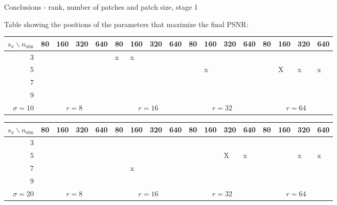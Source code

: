 \documentclass[mathserif, 8pt]{beamer}
\makeatletter
\newcounter{multipleslide}
\newcommand{\multipleframe}{%
\setcounter{multipleslide}{\value{framenumber}}
\stepcounter{multipleslide}
\patchcmd{\beamer@@tmpl@footline}%
	{\insertframenumber}%
	{\themultipleslide}%
	{}%
	{}%
}
\makeatother
\begin{document}
\multipleframe
\begin{frame}{Conclusions - rank, number of patches and patch size, stage 1}

	\begin{center}
		Table showing the positions of the parameters that maximize the final PSNR:

		\medskip

		{\small
		\begin{tabular}{r ||p{.1cm}|p{.1cm}|p{.1cm}|p{.1cm}||p{.1cm}|p{.1cm}|p{.1cm}|p{.1cm}||p{.1cm}|p{.1cm}|p{.1cm}|p{.1cm}||p{.1cm}|p{.1cm}|p{.1cm}|p{.1cm}||}
				$s_x \backslash n_{\text{sim}}$  & {\tiny 80} & {\tiny 160} & {\tiny 320} & {\tiny 640} & {\tiny 80} & {\tiny 160} & {\tiny 320} & {\tiny 640} & {\tiny 80} & {\tiny 160} & {\tiny 320} & {\tiny 640} & {\tiny 80} & {\tiny 160} & {\tiny 320} & {\tiny 640} \\\hline
		  3 &  &  &  &  &x &x &  &  &  &  &  &  &  &  &  &  \\[.1cm]\hline
		  5 &  &  &  &  &  &  &  &  &  &x &  &  &  &X &x &x \\[.1cm]\hline
		  7 &  &  &  &  &  &  &  &  &  &  &  &  &  &  &  &  \\[.1cm]\hline
		  9 &  &  &  &  &  &  &  &  &  &  &  &  &  &  &  &  \\[.1cm]\hline
		$\sigma=10$& \multicolumn{4}{c||}{$r =  8$} & 
		\multicolumn{4}{c||}{$r = 16$} & 
		\multicolumn{4}{c||}{$r = 32$} & 
		\multicolumn{4}{c||}{$r = 64$} 
		\end{tabular}}

		\medskip

		{\small
		\begin{tabular}{r ||p{.1cm}|p{.1cm}|p{.1cm}|p{.1cm}||p{.1cm}|p{.1cm}|p{.1cm}|p{.1cm}||p{.1cm}|p{.1cm}|p{.1cm}|p{.1cm}||p{.1cm}|p{.1cm}|p{.1cm}|p{.1cm}||}
				$s_x \backslash n_{\text{sim}}$  & {\tiny 80} & {\tiny 160} & {\tiny 320} & {\tiny 640} & {\tiny 80} & {\tiny 160} & {\tiny 320} & {\tiny 640} & {\tiny 80} & {\tiny 160} & {\tiny 320} & {\tiny 640} & {\tiny 80} & {\tiny 160} & {\tiny 320} & {\tiny 640} \\\hline
		  3 &  &  &  &  &  &  &  &  &  &  &  &  &  &  &  &  \\[.1cm]\hline
		  5 &  &  &  &  &  &  &  &  &  &  &X &x &  &  &x &x \\[.1cm]\hline
		  7 &  &  &  &  &  &x &  &  &  &  &  &  &  &  &  &  \\[.1cm]\hline
		  9 &  &  &  &  &  &  &  &  &  &  &  &  &  &  &  &  \\[.1cm]\hline
		$\sigma=20$& \multicolumn{4}{c||}{$r =  8$} & 
		\multicolumn{4}{c||}{$r = 16$} & 
		\multicolumn{4}{c||}{$r = 32$} & 
		\multicolumn{4}{c||}{$r = 64$} 
		\end{tabular}}


\end{center}
\end{frame}
\end{document}
